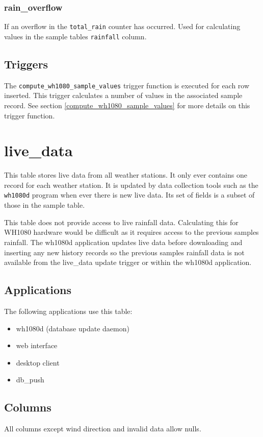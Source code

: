 \documentclass[a4paper,10pt]{book}
\begin{document}
\subsubsection{rain\_overflow}
If an overflow in the \verb|total_rain| counter has occurred. Used for calculating values in the sample tables \verb|rainfall| column.

\subsection{Triggers}
The \verb|compute_wh1080_sample_values| trigger function is executed for each row inserted. This trigger calculates a number of values in the associated sample record. See section \ref{compute_wh1080_sample_values} for more details on this trigger function.

\section{live\_data}
This table stores live data from all weather stations. It only ever contains one record for each weather station. It is updated by data collection tools such as the \verb|wh1080d| program when ever there is new live data. Its set of fields is a subset of those in the sample table.

This table does not provide access to live rainfall data. Calculating this for WH1080 hardware would be difficult as it requires access to the previous samples rainfall. The wh1080d application updates live data before downloading and inserting any new history records so the previous samples rainfall data is not available from the live\_data update trigger or within the wh1080d application.

\subsection{Applications}
The following applications use this table:
\begin{itemize}
\item wh1080d (database update daemon)
\item web interface
\item desktop client
\item db\_push
\end{itemize}

\subsection{Columns}
All columns except wind direction and invalid data allow nulls.
\end{document}
